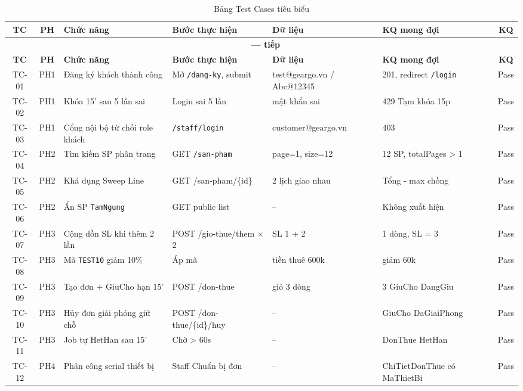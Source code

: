 \begin{longtable}{|c|c|p{3.5cm}|p{4cm}|p{2.5cm}|p{3cm}|c|}
\caption{Bảng Test Cases tiêu biểu} \label{tab:test_cases} \\
\hline
\textbf{TC} & \textbf{PH} & \textbf{Chức năng} & \textbf{Bước thực hiện} & \textbf{Dữ liệu} & \textbf{KQ mong đợi} & \textbf{KQ} \\ \hline
\endfirsthead
\multicolumn{7}{c}{{\bfseries \tablename\ \thetable{} --- tiếp}} \\
\hline
\textbf{TC} & \textbf{PH} & \textbf{Chức năng} & \textbf{Bước thực hiện} & \textbf{Dữ liệu} & \textbf{KQ mong đợi} & \textbf{KQ} \\ \hline
\endhead

TC-01 & PH1 & Đăng ký khách thành công        & Mở \texttt{/dang-ky}, submit & test@geargo.vn / Abc@12345 & 201, redirect \texttt{/login} & Pass \\ \hline
TC-02 & PH1 & Khóa 15' sau 5 lần sai          & Login sai 5 lần              & mật khẩu sai & 429 Tạm khóa 15p & Pass \\ \hline
TC-03 & PH1 & Cổng nội bộ từ chối role khách  & \texttt{/staff/login}        & customer@geargo.vn & 403 & Pass \\ \hline
TC-04 & PH2 & Tìm kiếm SP phân trang          & GET \texttt{/san-pham}       & page=1, size=12 & 12 SP, totalPages > 1 & Pass \\ \hline
TC-05 & PH2 & Khả dụng Sweep Line             & GET /san-pham/\{id\}         & 2 lịch giao nhau & Tổng - max chồng & Pass \\ \hline
TC-06 & PH2 & Ẩn SP \texttt{TamNgung}         & GET public list              & -- & Không xuất hiện & Pass \\ \hline
TC-07 & PH3 & Cộng dồn SL khi thêm 2 lần      & POST /gio-thue/them $\times$2 & SL 1 + 2 & 1 dòng, SL = 3 & Pass \\ \hline
TC-08 & PH3 & Mã \texttt{TEST10} giảm 10\%    & Áp mã                        & tiền thuê 600k & giảm 60k & Pass \\ \hline
TC-09 & PH3 & Tạo đơn + GiuCho hạn 15'        & POST /don-thue              & giỏ 3 dòng & 3 GiuCho DangGiu & Pass \\ \hline
TC-10 & PH3 & Hủy đơn giải phóng giữ chỗ      & POST /don-thue/\{id\}/huy   & -- & GiuCho DaGiaiPhong & Pass \\ \hline
TC-11 & PH3 & Job tự HetHan sau 15'           & Chờ > 60s                   & -- & DonThue HetHan & Pass \\ \hline
TC-12 & PH4 & Phân công serial thiết bị      & Staff Chuẩn bị đơn          & -- & ChiTietDonThue có MaThietBi & Pass \\ \hline

\end{longtable}
